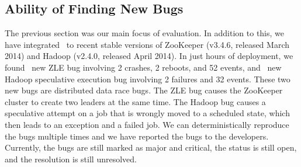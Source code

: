 

\subsection{Ability of Finding New Bugs}
\label{eval-newbugs}

The previous section was our main focus of evaluation.  In addition to
this, we have integrated \sampro\ to recent stable versions of ZooKeeper
(v3.4.6, released March 2014) and Hadoop (v2.4.0, released April 2014).  In
just hours of deployment, we found \numZkNewBugs\ new ZLE bug involving 2
crashes, 2 reboots, and 52 events, and \numMrNewBugs\ new Hadoop
speculative execution bug involving 2 failures and 32 events.  These two
new bugs are distributed data race bugs.  The ZLE bug causes the ZooKeeper
cluster to create two leaders at the same time.  The Hadoop bug causes a
speculative attempt on a job that is wrongly moved to a scheduled state,
which then leads to an exception and a failed job.  We can
deterministically reproduce the bugs multiple times and we have reported
the bugs to the developers.  Currently, the bugs are still marked as major
and critical, the status is still open, and the resolution is still
unresolved.




